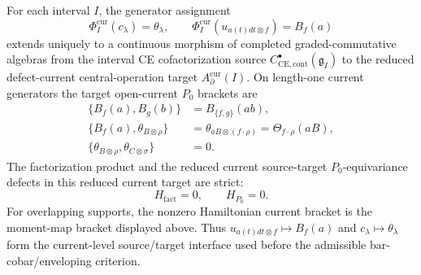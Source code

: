 \begin{thm}
\label{thm:app-factorization-universal-current-interface}
  For each interval \(I\), the generator assignment
  \[
    \Phi_I^{\mathrm{cur}}(c_\lambda)=\theta_\lambda,\qquad
    \Phi_I^{\mathrm{cur}}(u_{a(t)dt\otimes f})=B_f(a)
  \]
  extends uniquely to a continuous morphism of completed
  graded-commutative algebras from the interval CE cofactorization source
  \(C^\bullet_{\mathrm{CE},\mathrm{cont}}(\mathfrak g_I)\) to the
  reduced defect-current central-operation target
  \(A_\partial^{\mathrm{cur}}(I)\).  On length-one current generators
  the target open-current \(P_0\) brackets are
  \[
  \begin{aligned}
    \{B_f(a),B_g(b)\}
      &=B_{\{f,g\}}(ab),\\
    \{B_f(a),\theta_{B\otimes\rho}\}
      &=\theta_{aB\otimes(f\cdot\rho)}
        =\Theta_{f\cdot\rho}(aB),\\
    \{\theta_{B\otimes\rho},\theta_{C\otimes\sigma}\}
      &=0 .
  \end{aligned}
  \]
  The factorization product and the reduced current source-target
  \(P_0\)-equivariance defects in this reduced current target are strict:
  \[
    H_{\mathrm{fact}}=0,\qquad H_{P_0}=0.
  \]
  For overlapping supports, the nonzero Hamiltonian current bracket is
  the moment-map bracket displayed above.  Thus \(u_{a(t)dt\otimes f}\mapsto B_f(a)\) and
  \(c_\lambda\mapsto\theta_\lambda\) form the current-level
  source/target interface used before the admissible bar-cobar/enveloping
  criterion.
\end{thm}

